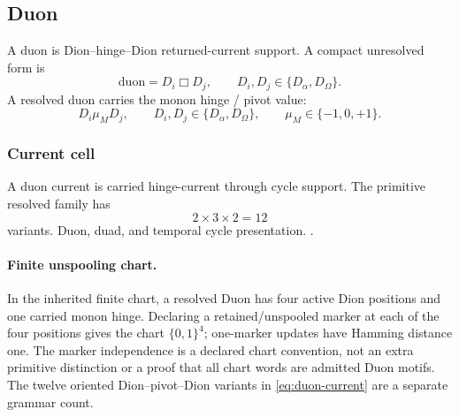 \subsection{Duon}\label{subsec:duon}
\begin{definition}
A duon is Dion--hinge--Dion returned-current support. A compact unresolved form is
\[
\mathrm{duon}=D_i\Box D_j,
\qquad D_i,D_j\in\{D_\alpha,D_\Omega\}.
\]
A resolved duon carries the monon hinge / pivot value:
\begin{equation}
D_i\mu_M D_j,
\qquad
D_i,D_j\in\{D_\alpha,D_\Omega\},
\qquad
\mu_M\in\{-1,0,+1\}.
\label{eq:duon-current}
\end{equation}
\end{definition}

\subsubsection{Current cell}\label{subsec:duon-current-cell}
A duon current is carried hinge-current through cycle support. The primitive resolved family has
\[
2\times3\times2=12
\]
variants. Duon, duad, and temporal cycle presentation. .

\paragraph{Finite unspooling chart.}
\label{subsec:finite-q4-witness}
In the inherited finite chart, a resolved Duon has four active Dion positions
and one carried monon hinge. Declaring a retained/unspooled marker at each of
the four positions gives the chart \(\{0,1\}^4\); one-marker updates have
Hamming distance one. The marker independence is a declared chart convention,
not an extra primitive distinction or a proof that all chart words are admitted
Duon motifs. The twelve oriented Dion--pivot--Dion variants in
\eqref{eq:duon-current} are a separate grammar count.


